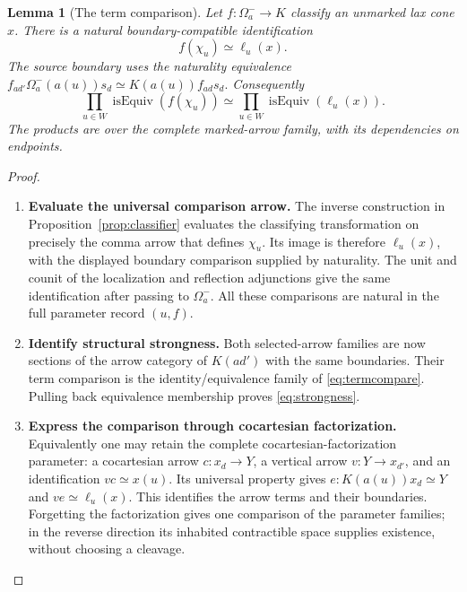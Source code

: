 \documentclass[oneside]{article}
\theoremstyle{plain}
\newtheorem{lemma}[theorem]{Lemma}
\theoremstyle{definition}
\theoremstyle{remark}
\newcommand{\isEq}{\operatorname{isEquiv}}
\begin{document}
\begin{lemma}[The term comparison]\label{lem:term}
Let $f:\Omega_a^-\to K$ classify an unmarked lax cone $x$. There is a natural boundary-compatible identification
\begin{equation}\label{eq:termcompare}
 f(\chi_u)\simeq\ell_u(x).
\end{equation}
The source boundary uses the naturality equivalence $f_{ad'}\Omega_a^-(a(u))s_d \simeq K(a(u))f_{ad}s_d.$ Consequently
\begin{equation}\label{eq:strongness}
 \prod_{u\in W}\isEq(f(\chi_u))
 \simeq
 \prod_{u\in W}\isEq(\ell_u(x)).
\end{equation}
The products are over the complete marked-arrow family, with its dependencies on endpoints.
\end{lemma}
\begin{proof}
\leavevmode
\begin{enumerate}
\item \textbf{Evaluate the universal comparison arrow.} The inverse construction in Proposition~\ref{prop:classifier} evaluates the classifying transformation on precisely the comma arrow that defines $\chi_u$. Its image is therefore $\ell_u(x)$, with the displayed boundary comparison supplied by naturality. The unit and counit of the localization and reflection adjunctions give the same identification after passing to $\Omega_a^-$. All these comparisons are natural in the full parameter record $(u,f)$.
\item \textbf{Identify structural strongness.} Both selected-arrow families are now sections of the arrow category of $K(ad')$ with the same boundaries. Their term comparison is the identity/equivalence family of \eqref{eq:termcompare}. Pulling back equivalence membership proves \eqref{eq:strongness}.
\item \textbf{Express the comparison through cocartesian factorization.} Equivalently one may retain the complete cocartesian-factorization
parameter: a cocartesian arrow $c:x_d\to Y$, a vertical arrow
$v:Y\to x_{d'}$, and an identification $vc\simeq x(u)$.
Its universal property gives $e:K(a(u))x_d\simeq Y$ and
$ve\simeq\ell_u(x)$. This identifies the arrow terms and their
boundaries. Forgetting the factorization gives one comparison of the
parameter families; in the reverse direction its inhabited contractible
space supplies existence, without choosing a cleavage.\qedhere
\end{enumerate}
\end{proof}
\end{document}
